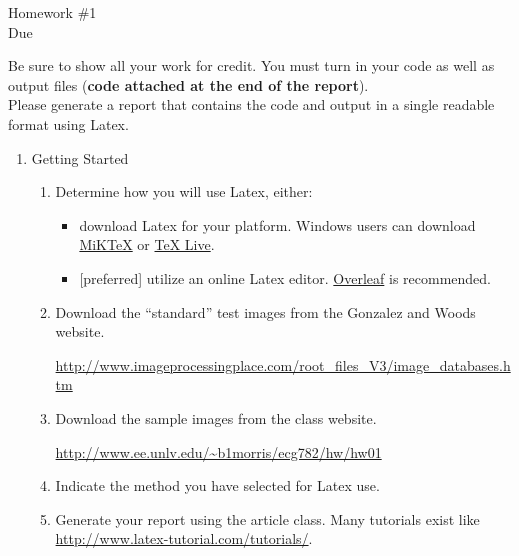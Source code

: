 \documentclass[letterpaper,11pt]{article}
\begin{document}
\begin{center}
Homework \#1\\
Due \hwone
\end{center}

Be sure to show all your work for credit.  You must turn in your code as well as output files (\textbf{code attached at the end of the report}).  \\[1pt]

Please generate a report that contains the code and output in a single readable format using Latex.

\begin{enumerate}


\item Getting Started

\begin{enumerate}
\item Determine how you will use Latex, either:

\begin{itemize}
\item download Latex for your platform. Windows users can download \href{http://miktex.org/}{MiKTeX} or \href{https://tug.org/texlive/}{TeX Live}.  
\item {[preferred]} utilize an online Latex editor.  \href{https://www.overleaf.com/}{Overleaf} is recommended.
\end{itemize}

\item Download the ``standard'' test images from the Gonzalez and Woods website. 

\url{http://www.imageprocessingplace.com/root_files_V3/image_databases.htm}

\item Download the sample images from the class website.

\url{http://www.ee.unlv.edu/~b1morris/ecg782/hw/hw01}

\item Indicate the method you have selected for Latex use.

\item Generate your report using the article class.  Many tutorials exist like \\\url{http://www.latex-tutorial.com/tutorials/}.

\end{enumerate}


\end{enumerate}
\end{document}
